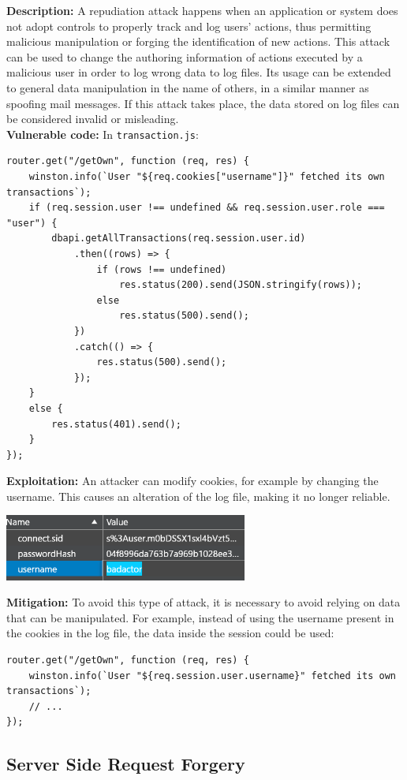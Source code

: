 \documentclass[]{article}
\begin{document}
\textbf{Description:} A repudiation attack happens when an application or system does not adopt controls to properly track and log users’ actions, thus permitting malicious manipulation or forging the identification of new actions. This attack can be used to change the authoring information of actions executed by a malicious user in order to log wrong data to log files. Its usage can be extended to general data manipulation in the name of others, in a similar manner as spoofing mail messages. If this attack takes place, the data stored on log files can be considered invalid or misleading.
\\ \textbf{Vulnerable code:} In \texttt{transaction.js}:
\begin{lstlisting}
router.get("/getOwn", function (req, res) {
    winston.info(`User "${req.cookies["username"]}" fetched its own transactions`);
    if (req.session.user !== undefined && req.session.user.role === "user") {
        dbapi.getAllTransactions(req.session.user.id)
            .then((rows) => {
                if (rows !== undefined)
                    res.status(200).send(JSON.stringify(rows));
                else
                    res.status(500).send();
            })
            .catch(() => {
                res.status(500).send();
            });
    }
    else {
        res.status(401).send();
    }
});
\end{lstlisting}
\textbf{Exploitation:} An attacker can modify cookies, for example by changing the username. This causes an alteration of the log file, making it no longer reliable.
\begin{center}
\includegraphics[width=8cm]{images/repudiation.eps}
\end{center}
\textbf{Mitigation:} To avoid this type of attack, it is necessary to avoid relying on data that can be manipulated. For example, instead of using the username present in the cookies in the log file, the data inside the session could be used:
\begin{lstlisting}
router.get("/getOwn", function (req, res) {
    winston.info(`User "${req.session.user.username}" fetched its own transactions`);
    // ...
});
\end{lstlisting}

\subsection{Server Side Request Forgery}
\end{document}
